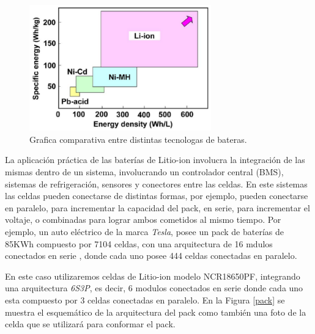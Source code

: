 \documentclass[10pt,a4paper]{article}
\begin{document}
    \begin{figure}[h!]
        \begin{center}
            \includegraphics[width=0.7\textwidth]{comparisson-liion.png}
            \caption{Grafica comparativa entre distintas
            tecnologas de bateras.}
            \label{comparisson_batt}
        \end{center}
    \end{figure}

	\noindent La aplicación práctica de las baterías de Litio-ion involucra la 
    integración de las mismas dentro de un sistema, involucrando un controlador 
    central (BMS), sistemas de refrigeración, sensores y conectores entre las 
    celdas. En este sistemas las celdas pueden conectarse de distintas 
    formas, por ejemplo, pueden conectarse en paralelo, para incrementar la 
    capacidad del pack, en serie, para incrementar el voltaje, o combinadas 
    para lograr ambos cometidos al mismo tiempo. Por ejemplo, un auto eléctrico 
    de la marca \emph{Tesla}, posee un pack de baterías de 85KWh compuesto por 
    7104 celdas, con una arquitectura de 16 mdulos conectados en serie
    , donde cada uno posee 444 celdas conectadas en paralelo.

    \clearpage

	\noindent En este caso utilizaremos celdas de Litio-ion modelo NCR18650PF, 
    integrando una arquitectura \emph{6S3P}, es decir, 6 modulos conectados en 
    serie donde cada uno esta compuesto por 3 celdas conectadas en paralelo. 
    En la Figura \ref{pack} se muestra el esquemático de la arquitectura del 
    pack como también una foto de la celda que se utilizará para conformar el 
    pack. 
	
\end{document}

